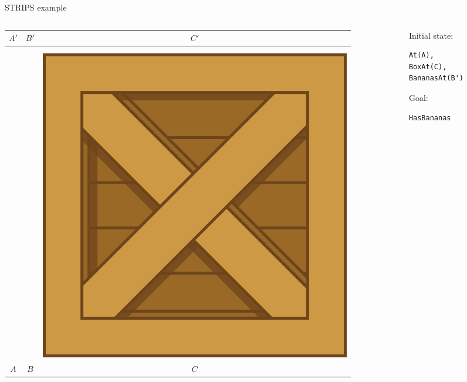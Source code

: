\newcommand{\boxbox}{\includegraphics[height=0.1\textheight]{crate}}


\begin{frame}[fragile]{STRIPS example}
	\begin{columns}
		\begin{column}{0.45\textwidth}
			\begin{tabular}{c|c|c}
				  $A'$  &   $B'$  &   $C'$  \\\hline
				\emptyy & \banana & \emptyy \\
				\emptyy & \emptyy & \emptyy \\
				\monkey & \emptyy & \boxbox \\\hline
				  $A$   &   $B$   &    $C$
			\end{tabular}
		\end{column}
		\begin{column}{0.5\textwidth}
			\pause Initial state:
			\begin{lstlisting}
At(A),
BoxAt(C),
BananasAt(B')
			\end{lstlisting}
			
			\vspace{2ex}
			
			\pause Goal:
			\begin{lstlisting}
HasBananas
			\end{lstlisting}
		\end{column}
	\end{columns}
\end{frame}

